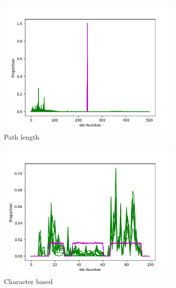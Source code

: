 \documentclass[ %
                    author={Samuel Russell},
                supervisor={Prof. Bogdan Warinschi},
                    degree={MEng},
                     title={Innocuous Ciphertexts},
                  subtitle={The DE-CENSOR Scheme},
                      type={research},
                      year={2018} ]{dissertation}
\begin{document}
\begin{figure}[h]
	\centering
	\begin{subfigure}[b]{0.3\linewidth}
		\includegraphics[width=\linewidth]{length_dist}
		\caption{Path length}
		\label{fig:length_hist}
	\end{subfigure}
	\begin{subfigure}[b]{0.3\linewidth}
		\includegraphics[width=\linewidth]{char_dist}
		\caption{Character based}
		\label{fig:char_hist}
	\end{subfigure}
	\begin{subfigure}[b]{0.3\linewidth}

\end{subfigure}
\end{figure}
\end{document}
